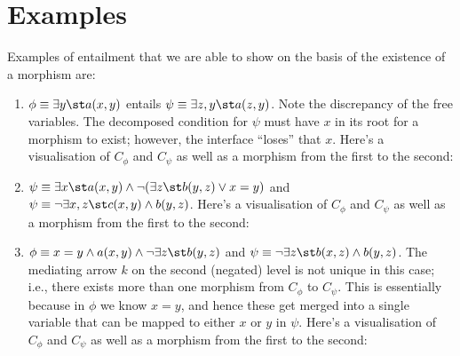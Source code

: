 \section{Examples}

Examples of entailment that we are able to show on the basis of the existence of a morphism are:
%
\begin{enumerate}
\item{} $\phi\equiv \exists y\st a(x,y)$ entails $\psi\equiv \exists z,y\st a(z,y)$. Note the discrepancy of the free variables. The decomposed condition for $\psi$ must have $x$ in its root for a morphism to exist; however, the interface ``loses'' that $x$. Here's a visualisation of $C_\phi$ and $C_\psi$ as well as a morphism from the first to the second:

  \begin{center}
    
  \end{center}
  
  \item{} $\psi\equiv \exists x\st a(x,y) \wedge \neg (\exists z\st b(y,z) \vee x=y)$ and $\psi\equiv \neg \exists x,z\st c(x,y)\wedge b(y,z)$. Here's a visualisation of $C_\phi$ and $C_\psi$ as well as a morphism from the first to the second:
  
    

  \item{} $\phi\equiv x=y\wedge a(x,y)\wedge \neg \exists z\st b(y,z)$ and $\psi\equiv \neg\exists z\st b(x,z)\wedge b(y,z)$. The mediating arrow $k$ on the second (negated) level is not unique in this case; i.e., there exists more than one morphism from $C_\phi$ to $C_\psi$. This is essentially because in $\phi$ we know $x=y$, and hence these get merged into a single variable that can be mapped to either $x$ or $y$ in $\psi$. Here's a visualisation of $C_\phi$ and $C_\psi$ as well as a morphism from the first to the second:
  

\end{enumerate}
